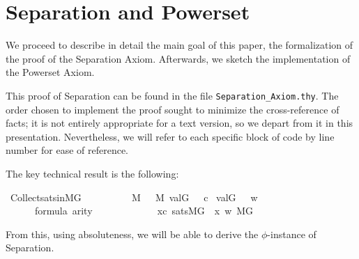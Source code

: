 \section{Separation and Powerset}
\label{sec:proof-separation}
We proceed to describe in detail the main goal of this paper, the formalization
of the proof of the Separation Axiom. Afterwards, we sketch  the
implementation of the Powerset Axiom.

This proof of Separation can be found in the file
\verb|Separation_Axiom.thy|. The order chosen to
implement
the proof sought to minimize the cross-reference of facts;  it is
not entirely appropriate for a text version, so we depart from it in
this presentation. Nevertheless, we will refer to each specific block
of code by line number for ease of reference.

The key technical result is the following:
\begin{isabelle}
  \isamarkupfalse%
  \ Collect{\isacharunderscore}sats{\isacharunderscore}in{\isacharunderscore}MG\ {\isacharcolon}\isanewline
  \ \ \isanewline
  \ \ \ \ {\isachardoublequoteopen}{\isasympi}\ {\isasymin}\ M{\isachardoublequoteclose}\ {\isachardoublequoteopen}{\isasymsigma}\ {\isasymin}\ M{\isachardoublequoteclose}\ {\isachardoublequoteopen}val{\isacharparenleft}G{\isacharcomma}\ {\isasympi}{\isacharparenright}\ {\isacharequal}\ c{\isachardoublequoteclose} \  {\isachardoublequoteopen}val{\isacharparenleft}G{\isacharcomma}\ {\isasymsigma}{\isacharparenright}\ {\isacharequal}\ w{\isachardoublequoteclose}\isanewline
  \ \ \ \ {\isachardoublequoteopen}{\isasymphi}\ {\isasymin}\ formula{\isachardoublequoteclose}\ {\isachardoublequoteopen}arity{\isacharparenleft}{\isasymphi}{\isacharparenright}\ {\isasymle}\ {}{\isachardoublequoteclose}\isanewline
  \ \ \ \ \ \ \isanewline
  \ \ \ \ {\isachardoublequoteopen}{\isacharbraceleft}x{\isasymin}c{\isachardot}\ sats{\isacharparenleft}M{\isacharbrackleft}G{\isacharbrackright}{\isacharcomma}\ {\isasymphi}{\isacharcomma}\ {\isacharbrackleft}x{\isacharcomma}\ w{\isacharbrackright}{\isacharparenright}{\isacharbraceright}{\isasymin}\ M{\isacharbrackleft}G{\isacharbrackright}{\isachardoublequoteclose}
\end{isabelle}
%
From this, using absoluteness, we will be able to derive the
$\phi$-instance of Separation. 

